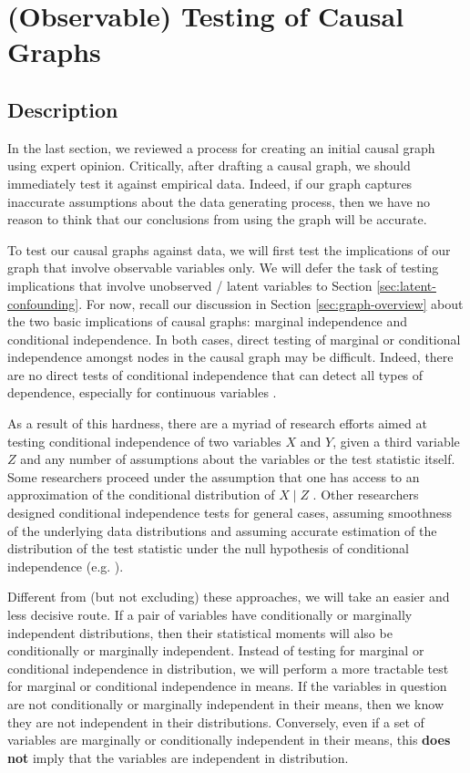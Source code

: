 \section{(Observable) Testing of Causal Graphs}
\label{sec:graph-testing}

\subsection{Description}
In the last section, we reviewed a process for creating an initial causal graph using expert opinion.
Critically, after drafting a causal graph, we should immediately test it against empirical data.
Indeed, if our graph captures inaccurate assumptions about the data generating process, then we have no reason to think that our conclusions from using the graph will be accurate.

To test our causal graphs against data, we will first test the implications of our graph that involve observable variables only.
We will defer the task of testing implications that involve unobserved / latent variables to Section \ref{sec:latent-confounding}.
For now, recall our discussion in Section \ref{sec:graph-overview} about the two basic implications of causal graphs: marginal independence and conditional independence.
In both cases, direct testing of marginal or conditional independence amongst nodes in the causal graph may be difficult.
Indeed, there are no direct tests of conditional independence that can detect all types of dependence, especially for continuous variables \citep{bergsma_2004_testing, shah_2020_hardness}.

As a result of this hardness, there are a myriad of research efforts aimed at testing conditional independence of two variables $X$ and $Y$, given a third variable $Z$ and any number of assumptions about the variables or the test statistic itself.
Some researchers proceed under the assumption that one has access to an approximation of the conditional distribution of $X \mid Z$ \citep{candes_2018_panning, berrett_2019_conditional}.
Other researchers designed conditional independence tests for general cases, assuming smoothness of the underlying data distributions and assuming accurate estimation of the distribution of the test statistic under the null hypothesis of conditional independence (e.g. \citet{zhang_2012_kernel, strobl_2019_approximate}).

Different from (but not excluding) these approaches, we will take an easier and less decisive route.
If a pair of variables have conditionally or marginally independent distributions, then their statistical moments will also be conditionally or marginally independent.
Instead of testing for marginal or conditional independence in distribution, we will perform a more tractable test for marginal or conditional independence in means.
If the variables in question are not conditionally or marginally independent in their means, then we know they are not independent in their distributions.
Conversely, even if a set of variables are marginally or conditionally independent in their means, this \textbf{does not} imply that the variables are independent in distribution.

